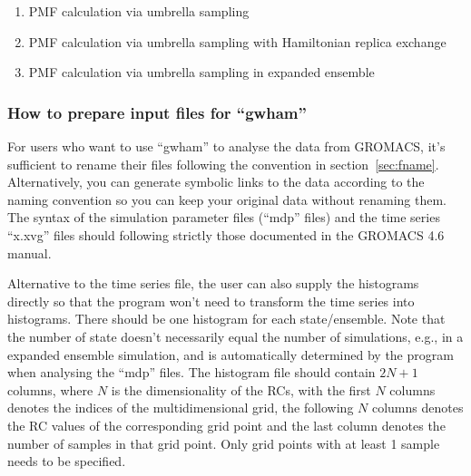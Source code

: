 \begin{enumerate}
  \item \label{it:umb} PMF calculation via umbrella sampling 
  \item \label{it:hrex} PMF calculation via umbrella sampling with Hamiltonian replica exchange 
  \item \label{it:expens} PMF calculation via umbrella sampling in expanded ensemble 
\end{enumerate}


\subsubsection{How to prepare input files for ``gwham''}\label{sec:fformat}
For users who want to use ``gwham'' to analyse the data from GROMACS, it's
sufficient to rename their files following the convention in
section~\ref{sec:fname}. Alternatively,  you can generate symbolic links to the
data according to the naming convention so you can keep your original data
without renaming them. The syntax of the simulation parameter files (``mdp''
files) and the time series ``x.xvg'' files should following strictly those
documented in the GROMACS 4.6 manual. 

Alternative to the time series file, the user can also supply the histograms
directly so that the program won't need to transform the time series into
histograms. There should be one histogram for each state/ensemble. Note that
the number of state doesn't necessarily equal the number of simulations, e.g.,
in a expanded ensemble simulation, and is automatically determined by the
program when analysing the ``mdp'' files.  The histogram file should contain
$2N+1$ columns, where $N$ is the dimensionality of the RCs, with the first $N$
columns denotes the indices of the multidimensional grid, the following $N$
columns denotes the RC values of the corresponding grid point and the last
column denotes the number of samples in that grid point. Only grid points with 
at least 1 sample needs to be specified.

